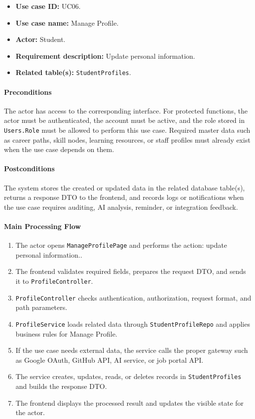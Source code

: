 \begin{itemize}
    \item \textbf{Use case ID:} UC06.
    \item \textbf{Use case name:} Manage Profile.
    \item \textbf{Actor:} Student.
    \item \textbf{Requirement description:} Update personal information.
    \item \textbf{Related table(s):} \texttt{StudentProfiles}.
\end{itemize}

\paragraph{Preconditions}

The actor has access to the corresponding interface. For protected functions, the actor must be authenticated, the account must be active, and the role stored in \texttt{Users.Role} must be allowed to perform this use case. Required master data such as career paths, skill nodes, learning resources, or staff profiles must already exist when the use case depends on them.

\paragraph{Postconditions}

The system stores the created or updated data in the related database table(s), returns a response DTO to the frontend, and records logs or notifications when the use case requires auditing, AI analysis, reminder, or integration feedback.

\paragraph{Main Processing Flow}

\begin{enumerate}
    \item The actor opens \texttt{ManageProfilePage} and performs the action: update personal information..
    \item The frontend validates required fields, prepares the request DTO, and sends it to \texttt{ProfileController}.
    \item \texttt{ProfileController} checks authentication, authorization, request format, and path parameters.
    \item \texttt{ProfileService} loads related data through \texttt{StudentProfileRepo} and applies business rules for Manage Profile.
    \item If the use case needs external data, the service calls the proper gateway such as Google OAuth, GitHub API, AI service, or job portal API.
    \item The service creates, updates, reads, or deletes records in \texttt{StudentProfiles} and builds the response DTO.
    \item The frontend displays the processed result and updates the visible state for the actor.
\end{enumerate}

